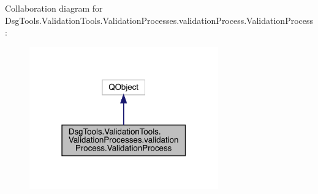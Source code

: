 Collaboration diagram for Dsg\+Tools.\+Validation\+Tools.\+Validation\+Processes.\+validation\+Process.\+Validation\+Process\+:
\nopagebreak
\begin{figure}[H]
\begin{center}
\leavevmode
\includegraphics[width=231pt]{class_dsg_tools_1_1_validation_tools_1_1_validation_processes_1_1validation_process_1_1_validation_process__coll__graph}
\end{center}
\end{figure}

